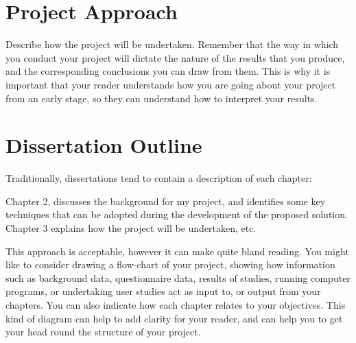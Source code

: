 \section{Project Approach}

Describe how the project will be undertaken.  Remember that the way in which
you conduct your project will dictate the nature of the results that you
produce, and the corresponding conclusions you can draw from them.  This is why
it is important that your reader understands how you are going about your
project from an early stage, so they can understand how to interpret your
results.

\section{Dissertation Outline}

Traditionally, dissertations tend to contain a description of each chapter:

Chapter 2, discusses the background for my project, and identifies some key
techniques that can be adopted during the development of the proposed solution.
Chapter 3 explains how the project will be undertaken, etc.

This approach is acceptable, however it can make quite bland reading.  You
might like to consider drawing a flow-chart of your project, showing how
information such as background data, questionnaire data, results of studies,
running computer programs, or undertaking user studies act as input to, or
output from your chapters. You can also indicate how each chapter relates to
your objectives.  This kind of diagram can help to add clarity for your reader,
and can help you to get your head round the structure of your project.
